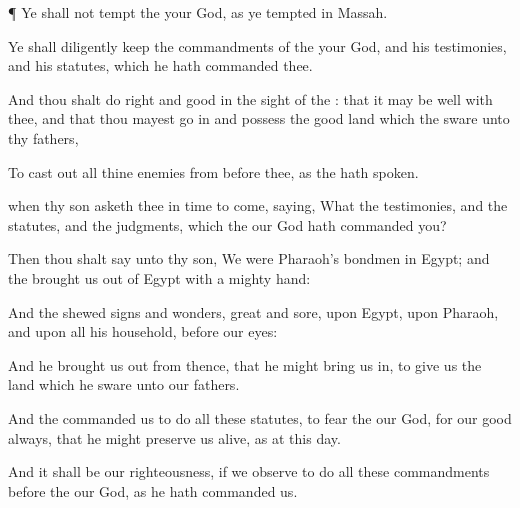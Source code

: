 {\par }{\PP {}¶ Ye shall not
tempt the
{} your
God, as ye
tempted
{} in
Massah.


\par }{\PP {}Ye shall
diligently
keep the
commandments of the
{} your
God, and his
testimonies, and his
statutes, which he hath
commanded thee.

And thou shalt
do
{}
right and
good in the
sight of the
{}: that it may be
well with thee, and that thou mayest go
in and
possess the
good
land which the
{}
sware unto thy
fathers,

To cast
out all thine
enemies from
before thee, as the
{} hath
spoken.

 when thy
son
asketh thee in time to
come,
saying, What
{} the
testimonies, and the
statutes, and the
judgments, which the
{} our
God hath
commanded you?

Then thou shalt
say unto thy
son, We were
Pharaoh’s
bondmen in
Egypt; and the
{} brought us
out of
Egypt with a
mighty
hand:

And the
{}
shewed
signs and
wonders,
great and
sore, upon
Egypt, upon
Pharaoh, and upon all his
household, before our
eyes:

And he brought us
out from thence, that he might bring us
in, to
give us the
land which he
sware unto our
fathers.

And the
{}
commanded us to
do all these
statutes, to
fear the
{} our
God, for our
good
always, that he might preserve us
alive, as
{} at this
day.

And it shall be our
righteousness, if we
observe to
do all
these
commandments
before the
{} our
God, as he hath
commanded us.




\par }
